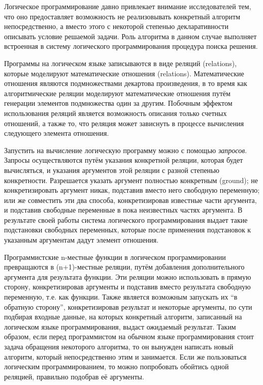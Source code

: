 
{\actuality}
Логическое программирование давно привлекает внимание исследователей тем, что оно предоставляет возможность не реализовывать конкретный алгоритм непосредственно, а вместо этого с некоторой степенью декларативности описывать условие решаемой задачи. Роль алгоритма в данном случае выполняет встроенная в систему логического программирования процедура поиска решения.

Программы на логическом языке записываются в виде реляций (relations), которые моделируют математические отношения (relations). 
Математические отношения являются подмножествами декартова произведения, в то время как алгоритмические реляции моделируют математические отношения путём генерации элементов подмножества один за другим. Побочным эффектом использования реляций является возможность описания только счетных отношений, а также то, что реляция может зависнуть в процессе вычисления следующего элемента отношения.

Запустить на вычисление логическую программу можно с помощью \emph{запросов}. Запросы осуществляются путём указания конкретной реляции, которая будет вычисляться, и указания аргументов этой реляции с разной степенью конкретности. Разрешается указать аргумент полностью конкретным (ground); не конкретизировать аргумент никак, подставив вместо него свободную переменную; или же совместить эти два способа, конкретизировав известные части аргумента, и подставив свободные переменные в пока неизвестных частях аргумента. В результате своей работы система логического программирования выдает такие подстановки свободных переменных, которые после применения подстановок к указанным аргументам дадут элемент отношения.

Программистские n-местные функции в логическом программировании 
превращаются в (n+1)-местные реляции, путём добавления дополнительного аргумента для результата функции. Эти реляции можно использовать в прямую сторону, конкретизировав аргументы и подставив вместо результата свободную переменную, т.е. как функции. Также является возможным запускать их ``в обратную сторону'', конкретизировав результат и некоторые аргументы, по сути подбирая входные данные, на которых конкретный алгоритм, записанный на логическом языке программирования, выдаст ожидаемый результат. Таким образом, если перед программистом на обычном языке программирования стоит задача обращения некоторого алгоритма, то он вынужден написать новый алгоритм, который непосредственно этим и занимается. Если же пользоваться логическим программированием, то можно попробовать обойтись одной реляцией, правильно подобрав её аргументы.

